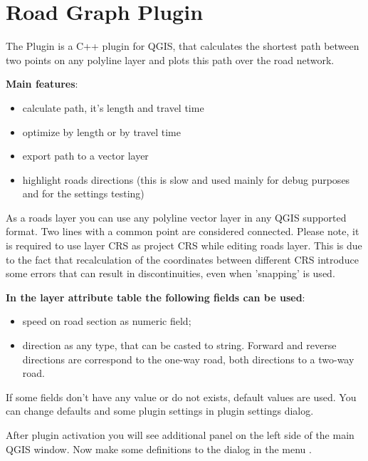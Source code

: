 
\section{Road Graph Plugin}\label{sec:roadgraph}

\updatedisclaimer


The  Plugin is a C++ plugin for QGIS, that calculates the shortest path 
between two points on any polyline layer and plots this path over the road network. 

\textbf{Main features}:

\begin{itemize}
\item calculate path, it's length and travel time
\item optimize by length or by travel time
\item export path to a vector layer
\item highlight roads directions (this is slow and used mainly for debug purposes and for the settings 
testing)
\end{itemize}

As a roads layer you can use any polyline vector layer in any QGIS supported format. Two lines with 
a common point are considered connected. Please note, it is required to use layer CRS as project CRS 
while editing roads layer. This is due to the fact that recalculation of the coordinates between 
different CRS introduce some errors that can result in discontinuities, even when 'snapping' is used.

\textbf{In the layer attribute table the following fields can be used}:

\begin{itemize}
\item speed on road section as numeric field;
\item direction as any type, that can be casted to string. Forward and reverse directions are correspond 
to the one-way road, both directions to a two-way road.
\end{itemize}

If some fields don't have any value or do not exists, default values are used. You can change defaults 
and some plugin settings in plugin settings dialog.


After plugin activation you will see additional panel on the left side of the main QGIS window. Now 
make some definitions to the  dialog in the menu 
 \arrow {}. 

